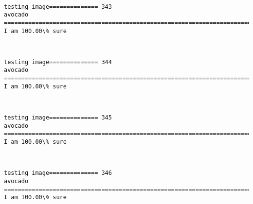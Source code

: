 \documentclass[11pt]{article}
\begin{document}
    \begin{center}
    \end{center}
    { \hspace*{\fill} \\}
    
    \begin{Verbatim}[commandchars=\\\{\}]
testing image============== 343
avocado
============================================================================
I am 100.00\% sure

    \end{Verbatim}

    \begin{center}
    \end{center}
    { \hspace*{\fill} \\}
    
    \begin{Verbatim}[commandchars=\\\{\}]
testing image============== 344
avocado
============================================================================
I am 100.00\% sure

    \end{Verbatim}

    \begin{center}
    \end{center}
    { \hspace*{\fill} \\}
    
    \begin{Verbatim}[commandchars=\\\{\}]
testing image============== 345
avocado
============================================================================
I am 100.00\% sure

    \end{Verbatim}

    \begin{center}
    \end{center}
    { \hspace*{\fill} \\}
    
    \begin{Verbatim}[commandchars=\\\{\}]
testing image============== 346
avocado
============================================================================
I am 100.00\% sure

    \end{Verbatim}
\end{document}
